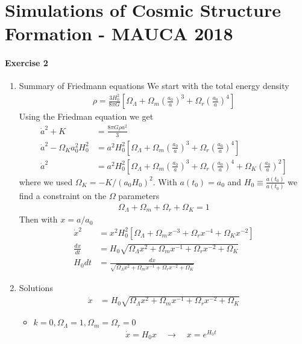 \documentclass[10pt,a4paper]{book}
\theoremstyle{definition}
\begin{document}
\newpage
\chapter{Simulations of Cosmic Structure Formation - MAUCA 2018}
\subsubsection{Exercise 2}
\begin{enumerate}
\item Summary of Friedmann equations
We start with the total energy density
\begin{align}
\rho=\frac{3H_0^2}{8\pi G}\left[
\Omega_\Lambda+
\Omega_m\left(\frac{a_0}{a}\right)^3+
\Omega_r\left(\frac{a_0}{a}\right)^4\right]
\end{align}
Using the Friedman equation we get
\begin{align}
\dot{a}^2+K
&=\frac{8\pi G\rho a^2}{3}\\
\dot{a}^2-\Omega_Ka_0^2H_0^2&=a^2H_0^2\left[
\Omega_\Lambda+
\Omega_m\left(\frac{a_0}{a}\right)^3+
\Omega_r\left(\frac{a_0}{a}\right)^4\right]\\
\dot{a}^2&=a^2H_0^2\left[
\Omega_\Lambda+
\Omega_m\left(\frac{a_0}{a}\right)^3+
\Omega_r\left(\frac{a_0}{a}\right)^4+
\Omega_K\left(\frac{a_0}{a}\right)^2\right]
\end{align}
where we used $\Omega_K=-K/(a_0H_0)^2$. With $a(t_0)=a_0$ and $H_0\equiv\frac{\dot{a}(t_0)}{a(t_0)}$ we find a constraint on the $\Omega$ parameters
\begin{align}
\Omega_\Lambda+\Omega_m+\Omega_r+\Omega_K=1
\end{align}
Then with $x=a/a_0$
\begin{align}
\dot{x}^2&=x^2H_0^2\left[
\Omega_\Lambda+
\Omega_m x^{-3}+
\Omega_r x^{-4}+
\Omega_K x^{-2}\right]\\
\frac{dx}{dt}&=H_0\sqrt{
\Omega_\Lambda x^2+
\Omega_m x^{-1}+
\Omega_r x^{-2}+
\Omega_K}\\
H_0dt&=
\frac{dx}{\sqrt{
\Omega_\Lambda x^2+
\Omega_m x^{-1}+
\Omega_r x^{-2}+
\Omega_K}}
\end{align}
\item Solutions
\begin{align}
\dot{x}&=H_0\sqrt{
\Omega_\Lambda x^2+
\Omega_m x^{-1}+
\Omega_r x^{-2}+
\Omega_K}
\end{align}
\begin{itemize}
\item $k=0, \Omega_\Lambda=1,\Omega_m=\Omega_r=0$
\begin{align}
\dot{x}=H_0x\quad\rightarrow\quad x=e^{H_0t}
\end{align}


\end{itemize}
\end{enumerate}
\end{document}
